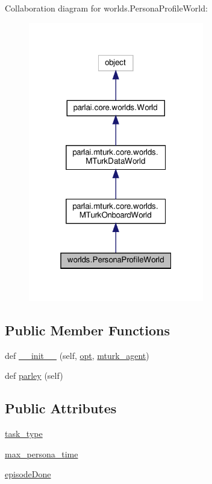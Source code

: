 Collaboration diagram for worlds.\+Persona\+Profile\+World\+:
\nopagebreak
\begin{figure}[H]
\begin{center}
\leavevmode
\includegraphics[width=217pt]{classworlds_1_1PersonaProfileWorld__coll__graph}
\end{center}
\end{figure}
\subsection*{Public Member Functions}
\begin{DoxyCompactItemize}
\item 
def \hyperlink{classworlds_1_1PersonaProfileWorld_a3e446a2c3a3eb33597a74dfc03850e7b}{\+\_\+\+\_\+init\+\_\+\+\_\+} (self, \hyperlink{classparlai_1_1core_1_1worlds_1_1World_a3640d92718acd3e6942a28c1ab3678bd}{opt}, \hyperlink{classparlai_1_1mturk_1_1core_1_1worlds_1_1MTurkOnboardWorld_a38d19c84f42e452f782df53df4fb9861}{mturk\+\_\+agent})
\item 
def \hyperlink{classworlds_1_1PersonaProfileWorld_a3e5bdadb542a4f06cd45ff15719474a0}{parley} (self)
\end{DoxyCompactItemize}
\subsection*{Public Attributes}
\begin{DoxyCompactItemize}
\item 
\hyperlink{classworlds_1_1PersonaProfileWorld_a09c94765229b11167b8691ae79e2d397}{task\+\_\+type}
\item 
\hyperlink{classworlds_1_1PersonaProfileWorld_abd185a8e8d25f69d13f403061f4ffbd6}{max\+\_\+persona\+\_\+time}
\item 
\hyperlink{classworlds_1_1PersonaProfileWorld_a43d9f2070cf88d0a1462e2b35b86b513}{episode\+Done}
\end{DoxyCompactItemize}


